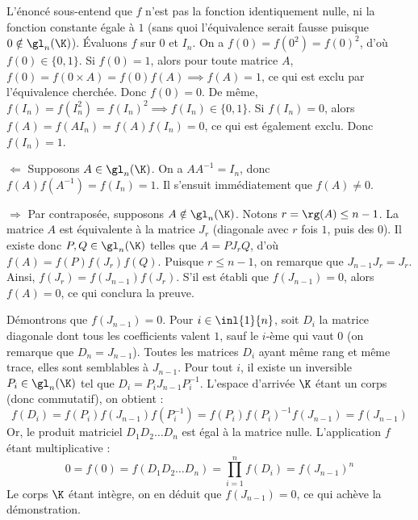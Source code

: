 \begin{solution}
    L'énoncé sous-entend que $f$ n'est pas la fonction identiquement nulle, ni la fonction constante égale à $1$ (sans quoi l'équivalence serait fausse puisque $0 \notin \gl_n(\K)$). 
    Évaluons $f$ sur $0$ et $I_n$.
    On a $f(0) = f(0^2) = f(0)^2$, d'où $f(0) \in \{0,1\}$. 
    Si $f(0)=1$, alors pour toute matrice $A$, $f(0) = f(0 \times A) = f(0)f(A) \implies f(A)=1$, ce qui est exclu par l'équivalence cherchée. Donc $f(0) = 0$.
    De même, $f(I_n) = f(I_n^2) = f(I_n)^2 \implies f(I_n) \in \{0,1\}$. Si $f(I_n)=0$, alors $f(A) = f(A I_n) = f(A)f(I_n) = 0$, ce qui est également exclu. Donc $f(I_n) = 1$.
    
    $\boxed{\Leftarrow}$ Supposons $A \in \gl_n(\K)$. 
    On a $A A^{-1} = I_n$, donc $f(A)f(A^{-1}) = f(I_n) = 1$. Il s'ensuit immédiatement que $f(A) \neq 0$.
    
    $\boxed{\Rightarrow}$ Par contraposée, supposons $A \notin \gl_n(\K)$. 
    Notons $r = \rg(A) \le n-1$. 
    La matrice $A$ est équivalente à la matrice $J_r$ (diagonale avec $r$ fois $1$, puis des $0$). 
    Il existe donc $P,Q \in \gl_n(\K)$ telles que $A = P J_r Q$, d'où $f(A) = f(P)f(J_r)f(Q)$. 
    Puisque $r \le n-1$, on remarque que $J_{n-1} J_r = J_r$. 
    Ainsi, $f(J_r) = f(J_{n-1})f(J_r)$. S'il est établi que $f(J_{n-1}) = 0$, alors $f(A) = 0$, ce qui conclura la preuve.
    
    Démontrons que $f(J_{n-1}) = 0$. 
    Pour $i \in \inl{1}{n}$, soit $D_i$ la matrice diagonale dont tous les coefficients valent $1$, sauf le $i$-ème qui vaut $0$ (on remarque que $D_n = J_{n-1}$). 
    Toutes les matrices $D_i$ ayant même rang et même trace, elles sont semblables à $J_{n-1}$.
    Pour tout $i$, il existe un inversible $P_i \in \gl_n(\K)$ tel que $D_i = P_i J_{n-1} P_i^{-1}$.
    L'espace d'arrivée $\K$ étant un corps (donc commutatif), on obtient :
    \[
        f(D_i) = f(P_i)f(J_{n-1})f(P_i^{-1}) = f(P_i)f(P_i)^{-1}f(J_{n-1}) = f(J_{n-1})
    \]
    Or, le produit matriciel $D_1 D_2 \dots D_n$ est égal à la matrice nulle. 
    L'application $f$ étant multiplicative :
    \[
        0 = f(0) = f(D_1 D_2 \dots D_n) = \prod_{i=1}^n f(D_i) = f(J_{n-1})^n
    \]
    Le corps $\K$ étant intègre, on en déduit que $f(J_{n-1}) = 0$, ce qui achève la démonstration.
\end{solution}